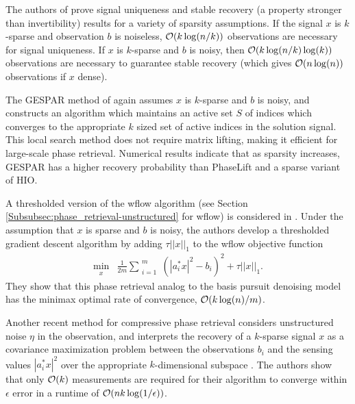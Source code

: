 The authors of \cite{DBLP:journals/corr/abs-1211-0872} prove signal uniqueness and stable recovery (a property stronger than invertibility) results for a variety of sparsity assumptions.  If the signal $x$ is $k$-sparse and observation $b$ is noiseless, ${\mathcal O}(k \log(n/k))$ observations are necessary for signal uniqueness.  If $x$ is $k$-sparse and $b$ is noisy, then ${\mathcal O}(k \log(n/k) \log(k))$ observations are necessary to guarantee stable recovery (which gives ${\mathcal O}(n \log(n))$ observations if $x$ dense).

The GESPAR method of \cite{shechtman2014gespar} again assumes $x$ is $k$-sparse and $b$ is noisy, and constructs an algorithm which maintains an active set $S$ of indices which converges to the appropriate $k$ sized set of active indices in the solution signal.  This local search method does not require matrix lifting, making it efficient for large-scale phase retrieval.  Numerical results \cite[Section 5]{shechtman2014gespar} indicate that as sparsity increases, GESPAR has a higher recovery probability than PhaseLift and a sparse variant of HIO.

A thresholded version of the wflow algorithm (see Section \ref{Subsubsec:phase_retrieval-unstructured} for wflow) is considered in \cite{cai2016optimal}.  Under the assumption that $x$ is sparse and $b$ is noisy, the authors develop a thresholded gradient descent algorithm by adding $\tau ||x||_1$ to the wflow objective function
\begin{equation}
\begin{array}{ll}
	\min\limits_{\substack{x}}
		&	\frac{1}{2m} \sum\limits_{\substack{i=1}}^{\substack{m}} \left( |a_i^*x|^2 - b_i \right)^2
			+ \tau ||x||_1.
\end{array}
\end{equation}
They show that this phase retrieval analog to the basis pursuit denoising model \cite{chen2001atomic} has the minimax optimal rate of convergence, ${\mathcal O} (k \log(n) / m)$.

Another recent method for compressive phase retrieval considers unstructured noise $\eta$ in the observation, and interprets the recovery of a $k$-sparse signal $x$ as a covariance maximization problem between the observations $b_i$ and the sensing values $|a_i^*x|^2$ over the appropriate $k$-dimensional subspace \cite{zhang2017fast}.  The authors show that only ${\mathcal O}(k)$ measurements are required for their algorithm to converge within $\epsilon$ error in a runtime of ${\mathcal O}(nk \log(1/ \epsilon))$.





